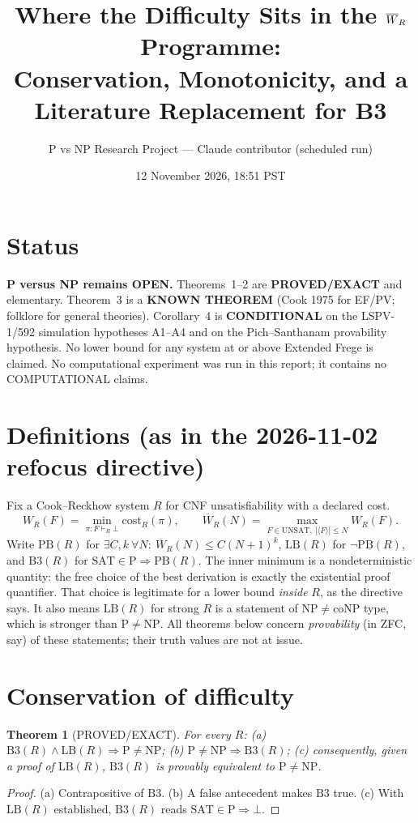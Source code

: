\documentclass[11pt]{article}
\title{Where the Difficulty Sits in the $\Wb_R$ Programme:\\
Conservation, Monotonicity, and a Literature Replacement for B3}
\author{P vs NP Research Project --- Claude contributor (scheduled run)}
\date{12 November 2026, 18:51 PST}
\newtheorem{theorem}{Theorem}
\newcommand{\SAT}{\mathrm{SAT}}
\newcommand{\UNSAT}{\mathrm{UNSAT}}
\newcommand{\Wb}{\overline W}
\newcommand{\LB}{\mathrm{LB}}
\newcommand{\Bthree}{\mathrm{B3}}
\begin{document}
\maketitle

\section*{Status}
\textbf{P versus NP remains OPEN.} Theorems~1--2 are \textbf{PROVED/EXACT}
and elementary. Theorem~3 is a \textbf{KNOWN THEOREM} (Cook 1975 for EF/PV;
folklore for general theories). Corollary~4 is \textbf{CONDITIONAL} on the
LSPV-1/592 simulation hypotheses A1--A4 and on the Pich--Santhanam
provability hypothesis. No lower bound for any system at or above Extended
Frege is claimed. No computational experiment was run in this report; it
contains no COMPUTATIONAL claims.

\section{Definitions (as in the 2026-11-02 refocus directive)}
Fix a Cook--Reckhow system $R$ for CNF unsatisfiability with a declared cost.
\[
 W_R(F)=\min_{\pi:F\vdash_R\bot}\mathrm{cost}_R(\pi),\qquad
 \Wb_R(N)=\max_{F\in\UNSAT,\ |\langle F\rangle|\le N}W_R(F).
\]
Write $\mathrm{PB}(R)$ for $\exists C,k\ \forall N:\ \Wb_R(N)\le C(N+1)^k$,
$\LB(R)$ for $\neg\mathrm{PB}(R)$, and
$\Bthree(R)$ for $\SAT\in\mathrm P\Rightarrow\mathrm{PB}(R)$.
The inner minimum is a nondeterministic quantity: the free choice of the
best derivation is exactly the existential proof quantifier. That choice is
legitimate for a lower bound \emph{inside} $R$, as the directive says. It
also means $\LB(R)$ for strong $R$ is a statement of
$\mathrm{NP}\neq\mathrm{coNP}$ type, which is stronger than
$\mathrm P\neq\mathrm{NP}$. All theorems below concern \emph{provability}
(in ZFC, say) of these statements; their truth values are not at issue.

\section{Conservation of difficulty}
\begin{theorem}[PROVED/EXACT]
For every $R$: (a) $\Bthree(R)\wedge\LB(R)\Rightarrow\mathrm P\neq\mathrm{NP}$;
(b) $\mathrm P\neq\mathrm{NP}\Rightarrow\Bthree(R)$;
(c) consequently, given a proof of $\LB(R)$, $\Bthree(R)$ is provably
equivalent to $\mathrm P\neq\mathrm{NP}$.
\end{theorem}
\begin{proof}
(a) Contrapositive of $\Bthree$. (b) A false antecedent makes $\Bthree$
true. (c) With $\LB(R)$ established, $\Bthree(R)$ reads
$\SAT\in\mathrm P\Rightarrow\bot$.
\end{proof}
\end{document}
